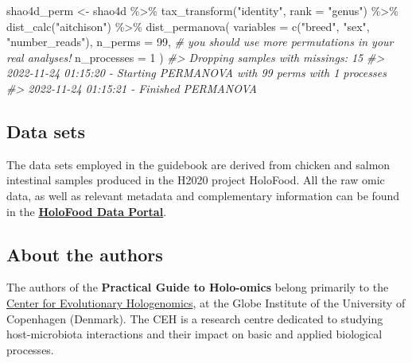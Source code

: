 \documentclass[
]{book}
\newenvironment{Shaded}{\begin{snugshade}}{\end{snugshade}}
\newcommand{\AttributeTok}[1]{\textcolor[rgb]{0.77,0.63,0.00}{#1}}
\newcommand{\CommentTok}[1]{\textcolor[rgb]{0.56,0.35,0.01}{\textit{#1}}}
\newcommand{\DecValTok}[1]{\textcolor[rgb]{0.00,0.00,0.81}{#1}}
\newcommand{\FunctionTok}[1]{\textcolor[rgb]{0.00,0.00,0.00}{#1}}
\newcommand{\NormalTok}[1]{#1}
\newcommand{\OtherTok}[1]{\textcolor[rgb]{0.56,0.35,0.01}{#1}}
\newcommand{\SpecialCharTok}[1]{\textcolor[rgb]{0.00,0.00,0.00}{#1}}
\newcommand{\StringTok}[1]{\textcolor[rgb]{0.31,0.60,0.02}{#1}}
\begin{document}
\begin{Shaded}
\begin{Highlighting}[]
\NormalTok{shao4d\_perm }\OtherTok{\textless{}{-}}\NormalTok{ shao4d }\SpecialCharTok{\%\textgreater{}\%}
  \FunctionTok{tax\_transform}\NormalTok{(}\StringTok{"identity"}\NormalTok{, }\AttributeTok{rank =} \StringTok{"genus"}\NormalTok{) }\SpecialCharTok{\%\textgreater{}\%}
  \FunctionTok{dist\_calc}\NormalTok{(}\StringTok{"aitchison"}\NormalTok{) }\SpecialCharTok{\%\textgreater{}\%}
  \FunctionTok{dist\_permanova}\NormalTok{(}
    \AttributeTok{variables =} \FunctionTok{c}\NormalTok{(}\StringTok{"breed"}\NormalTok{, }\StringTok{"sex"}\NormalTok{, }\StringTok{"number\_reads"}\NormalTok{),}
    \AttributeTok{n\_perms =} \DecValTok{99}\NormalTok{, }\CommentTok{\# you should use more permutations in your real analyses!}
    \AttributeTok{n\_processes =} \DecValTok{1}
\NormalTok{  )}
\CommentTok{\#\textgreater{} Dropping samples with missings: 15}
\CommentTok{\#\textgreater{} 2022{-}11{-}24 01:15:20 {-} Starting PERMANOVA with 99 perms with 1 processes}
\CommentTok{\#\textgreater{} 2022{-}11{-}24 01:15:21 {-} Finished PERMANOVA}
\end{Highlighting}
\end{Shaded}

\hypertarget{datasets}{%
\subsection*{Data sets}\label{datasets}}

The data sets employed in the guidebook are derived from chicken and salmon intestinal samples produced in the H2020 project HoloFood. All the raw omic data, as well as relevant metadata and complementary information can be found in the \textbf{\href{https://www.holofooddata.org}{HoloFood Data Portal}}.

\hypertarget{about-the-authors}{%
\subsection*{About the authors}\label{about-the-authors}}

The authors of the \textbf{Practical Guide to Holo-omics} belong primarily to the \href{https://ceh.ku.dk/}{Center for Evolutionary Hologenomics}, at the Globe Institute of the University of Copenhagen (Denmark). The CEH is a research centre dedicated to studying host-microbiota interactions and their impact on basic and applied biological processes.
\end{document}
